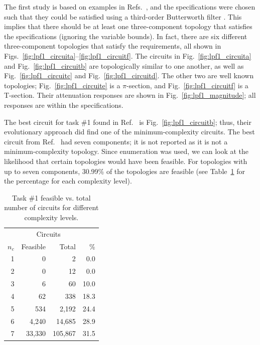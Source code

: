 

The first study is based on examples in Refs.~\cite{Lohn1999a, Goh2001a}, and the specifications were chosen such that they could be satisfied using a third-order Butterworth filter \cite{Lohn1999a}.
This implies that there should be at least one three-component topology that satisfies the specifications (ignoring the variable bounds).
In fact, there are six different three-component topologies that satisfy the requirements, all shown in Figs.~\ref{fig:lpf1_circuita}--\ref{fig:lpf1_circuitf}.
The circuits in Fig.~\ref{fig:lpf1_circuita} and Fig.~\ref{fig:lpf1_circuitb} are topologically similar to one another, as well as Fig.~\ref{fig:lpf1_circuitc} and Fig.~\ref{fig:lpf1_circuitd}.
The other two are well known topologies; Fig.~\ref{fig:lpf1_circuite} is a $\pi$-section, and Fig.~\ref{fig:lpf1_circuitf} is a T-section.
Their attenuation responses are shown in Fig.~\ref{fig:lpf1_magnitude}; all responses are within the specifications.

The best circuit for task \#1 found in Ref.~\cite{Goh2001a} is Fig.~\ref{fig:lpf1_circuitb}; thus, their evolutionary approach did find one of the minimum-complexity circuits. 
The best circuit from Ref.~\cite{Lohn1999a} had seven components; it is not reported as it is not a minimum-complexity topology.
Since enumeration was used, we can look at the likelihood that certain topologies would have been feasible.
For topologies with up to seven components, 30.99\% of the topologies are feasible (see Table~\ref{tb:ch6:nc:feasible:task1} for the percentage for each complexity level).

\begin{table}
\centering
\caption{Task \#1 feasible vs. total number of circuits for different complexity levels.\label{tb:ch6:nc:feasible:task1}}
\begin{tabular}{rrrr}
\hline \hline
& \multicolumn{2}{c}{Circuits} & \\
$n_c$ & Feasible & Total & \%  \\
\hline
1 & 0 & 2 & 0.0 \\
2 & 0 & 12 & 0.0 \\
3 & 6 & 60 & 10.0 \\
4 & 62 & 338 & 18.3 \\
5 & 534 & 2,192 & 24.4 \\
6 & 4,240 & 14,685 & 28.9 \\
7 & 33,330 & 105,867 & 31.5 \\
\hline \hline
\end{tabular}
\end{table}

